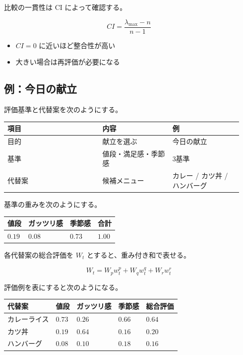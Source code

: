 \documentclass[12pt]{ltjsarticle}
\begin{document}
比較の一貫性は CI によって確認する。

\[
CI = \frac{\lambda_{\text{max}} - n}{n - 1}
\]

\begin{itemize}
\item \(CI = 0\) に近いほど整合性が高い
\item 大きい場合は再評価が必要になる
\end{itemize}

\subsection{例：今日の献立}

評価基準と代替案を次のようにする。

{\def\LTcaptype{none}
\begin{longtable}{@{}p{0.38\linewidth}p{0.28\linewidth}p{0.28\linewidth}@{}}
\toprule\noalign{}
項目 & 内容 & 例 \\
\midrule\noalign{}
\endhead
\bottomrule\noalign{}
\endlastfoot
目的 & 献立を選ぶ & 今日の献立 \\
基準 & 値段・満足感・季節感 & 3基準 \\
代替案 & 候補メニュー & カレー / カツ丼 / ハンバーグ \\
\end{longtable}
}

基準の重みを次のようにする。

{\def\LTcaptype{none}
\begin{longtable}[]{@{}llll@{}}
\toprule\noalign{}
値段 & ガッツリ感 & 季節感 & 合計 \\
\midrule\noalign{}
\endhead
\bottomrule\noalign{}
\endlastfoot
\(0.19\) & \(0.08\) & \(0.73\) & \(1.00\) \\
\end{longtable}
}

各代替案の総合評価を \(W_t\) とすると、重み付き和で表せる。

\[
W_t = W_p w_t^p + W_q w_t^q + W_r w_t^r
\]

評価例を表にすると次のようになる。

{\def\LTcaptype{none}
\begin{longtable}[]{@{}lllll@{}}
\toprule\noalign{}
代替案 & 値段 & ガッツリ感 & 季節感 & 総合評価 \\
\midrule\noalign{}
\endhead
\bottomrule\noalign{}
\endlastfoot
カレーライス & \(0.73\) & \(0.26\) & \(0.66\) & \(0.64\) \\
カツ丼 & \(0.19\) & \(0.64\) & \(0.16\) & \(0.20\) \\
ハンバーグ & \(0.08\) & \(0.10\) & \(0.18\) & \(0.16\) \\
\end{longtable}
}
\end{document}
